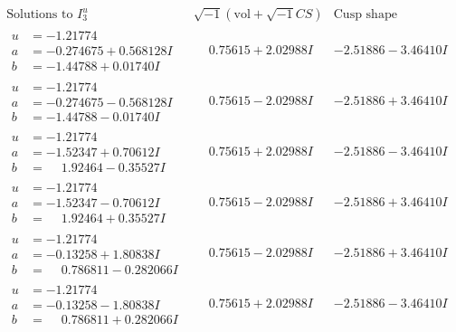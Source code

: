 \documentclass[1p]{elsarticle_modified}
\theoremstyle{definition}
\newcommand{\I}{\sqrt{-1}}
\begin{document}
$$\begin{array}{c|c|c}  
\text{Solutions to }I^u_{3}& \I (\text{vol} + \sqrt{-1}CS) & \text{Cusp shape}\\
 \hline 
\begin{aligned}
u &= -1.21774\phantom{ +0.000000I} \\
a &= -0.274675 + 0.568128 I \\
b &= -1.44788 + 0.01740 I\end{aligned}
 & \phantom{-}0.75615 + 2.02988 I & -2.51886 - 3.46410 I \\ \hline\begin{aligned}
u &= -1.21774\phantom{ +0.000000I} \\
a &= -0.274675 - 0.568128 I \\
b &= -1.44788 - 0.01740 I\end{aligned}
 & \phantom{-}0.75615 - 2.02988 I & -2.51886 + 3.46410 I \\ \hline\begin{aligned}
u &= -1.21774\phantom{ +0.000000I} \\
a &= -1.52347 + 0.70612 I \\
b &= \phantom{-}1.92464 - 0.35527 I\end{aligned}
 & \phantom{-}0.75615 + 2.02988 I & -2.51886 - 3.46410 I \\ \hline\begin{aligned}
u &= -1.21774\phantom{ +0.000000I} \\
a &= -1.52347 - 0.70612 I \\
b &= \phantom{-}1.92464 + 0.35527 I\end{aligned}
 & \phantom{-}0.75615 - 2.02988 I & -2.51886 + 3.46410 I \\ \hline\begin{aligned}
u &= -1.21774\phantom{ +0.000000I} \\
a &= -0.13258 + 1.80838 I \\
b &= \phantom{-}0.786811 - 0.282066 I\end{aligned}
 & \phantom{-}0.75615 - 2.02988 I & -2.51886 + 3.46410 I \\ \hline\begin{aligned}
u &= -1.21774\phantom{ +0.000000I} \\
a &= -0.13258 - 1.80838 I \\
b &= \phantom{-}0.786811 + 0.282066 I\end{aligned}
 & \phantom{-}0.75615 + 2.02988 I & -2.51886 - 3.46410 I \\ \hline\begin{aligned}

\end{aligned}
\end{array}$$
\end{document}
